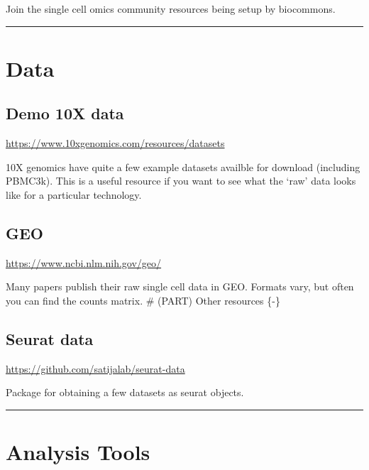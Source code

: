 \documentclass[
]{book}
\begin{document}
Join the single cell omics community resources being setup by biocommons.

\begin{center}\rule{0.5\linewidth}{0.5pt}\end{center}

\hypertarget{data}{%
\section{Data}\label{data}}

\hypertarget{demo-10x-data}{%
\subsection*{Demo 10X data}\label{demo-10x-data}}

\url{https://www.10xgenomics.com/resources/datasets}

10X genomics have quite a few example datasets availble for download (including PBMC3k).
This is a useful resource if you want to see what the `raw' data looks like for a particular technology.

\hypertarget{geo}{%
\subsection*{GEO}\label{geo}}

\url{https://www.ncbi.nlm.nih.gov/geo/}

Many papers publish their raw single cell data in GEO. Formats vary, but often you can find the counts matrix.
\# (PART) Other resources \{-\}

\hypertarget{seurat-data}{%
\subsection*{Seurat data}\label{seurat-data}}

\url{https://github.com/satijalab/seurat-data}

Package for obtaining a few datasets as seurat objects.

\begin{center}\rule{0.5\linewidth}{0.5pt}\end{center}

\hypertarget{analysis-tools}{%
\section{Analysis Tools}\label{analysis-tools}}
\end{document}
